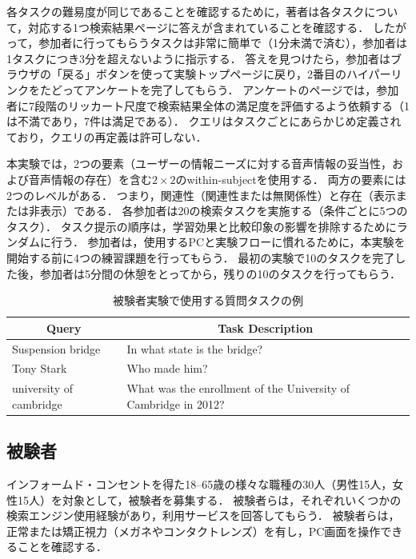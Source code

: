 \documentclass[pdflatex,ja=standard]{bxjsarticle}
\begin{document}
各タスクの難易度が同じであることを確認するために，著者は各タスクについて，対応する1つ検索結果ページに答えが含まれていることを確認する．
したがって，参加者に行ってもらうタスクは非常に簡単で（1分未満で済む），参加者は1タスクにつき3分を超えないように指示する．
答えを見つけたら，参加者はブラウザの「戻る」ボタンを使って実験トップページに戻り，2番目のハイパーリンクをたどってアンケートを完了してもらう．
アンケートのページでは，参加者に7段階のリッカート尺度で検索結果全体の満足度を評価するよう依頼する（1は不満であり，7件は満足である）．
クエリはタスクごとにあらかじめ定義されており，クエリの再定義は許可しない．

本実験では，2つの要素（ユーザーの情報ニーズに対する音声情報の妥当性，および音声情報の存在）を含む$2\times 2$のwithin-subjectを使用する．
両方の要素には2つのレベルがある．
つまり，関連性（関連性または無関係性）と存在（表示または非表示）である．
各参加者は20の検索タスクを実施する（条件ごとに5つのタスク）．
タスク提示の順序は，学習効果と比較印象の影響を排除するためにランダムに行う．
参加者は，使用するPCと実験フローに慣れるために，本実験を開始する前に4つの練習課題を行ってもらう．
最初の実験で10のタスクを完了した後，参加者は5分間の休憩をとってから，残りの10のタスクを行ってもらう．

\begin{table}[htb]
\begin{center}
\caption{被験者実験で使用する質問タスクの例}
\begin{tabular}{ll}
    \hline
    \multicolumn{1}{c}{Query} & \multicolumn{1}{c}{Task Description} \\
    \hline
    Suspension bridge & In what state is the bridge? \\
    Tony Stark & Who made him? \\
    university of cambridge & What was the enrollment of the University of Cambridge in 2012? \\
    \hline
\end{tabular}
\end{center}
\end{table}

\subsection{被験者}
インフォームド・コンセントを得た18--65歳の様々な職種の30人（男性15人，女性15人）を対象として，被験者を募集する．
被験者らは，それぞれいくつかの検索エンジン使用経験があり，利用サービスを回答してもらう．
被験者らは，正常または矯正視力（メガネやコンタクトレンズ）を有し，PC画面を操作できることを確認する．
\end{document}
